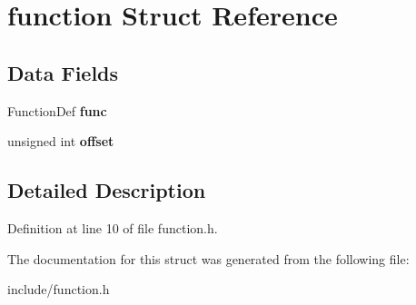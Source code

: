 \hypertarget{structfunction}{}\section{function Struct Reference}
\label{structfunction}
\subsection*{Data Fields}
\begin{DoxyCompactItemize}
\item 
\mbox{\label{structfunction_a8e4db4587a4eb2e46ed27f93a73a70d5}} 
Function\+Def {\bfseries func}
\item 
\mbox{\label{structfunction_aa9e72a5cb272fa0c5a35b628e13393f6}} 
unsigned int {\bfseries offset}
\end{DoxyCompactItemize}


\subsection{Detailed Description}


Definition at line 10 of file function.\+h.



The documentation for this struct was generated from the following file\+:\begin{DoxyCompactItemize}
\item 
include/function.\+h\end{DoxyCompactItemize}
